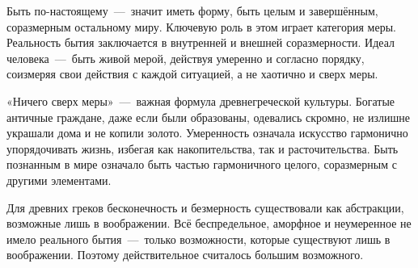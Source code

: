 \begin{enumerate}
Быть по-настоящему~---~значит иметь форму, быть целым и завершённым, соразмерным остальному миру. Ключевую роль в этом играет категория меры. Реальность бытия заключается в внутренней и внешней соразмерности. Идеал человека~---~быть живой мерой, действуя умеренно и согласно порядку, соизмеряя свои действия с каждой ситуацией, а не хаотично и сверх меры.


«Ничего сверх меры»~---~важная формула древнегреческой культуры. Богатые античные граждане, даже если были образованы, одевались скромно, не излишне украшали дома и не копили золото. Умеренность означала искусство гармонично упорядочивать жизнь, избегая как накопительства, так и расточительства. Быть познанным в мире означало быть частью гармоничного целого, соразмерным с другими элементами.


Для древних греков бесконечность и безмерность существовали как абстракции, возможные лишь в воображении. Всё беспредельное, аморфное и неумеренное не имело реального бытия~---~только возможности, которые существуют лишь в воображении. Поэтому действительное считалось большим возможного.


\end{enumerate}
